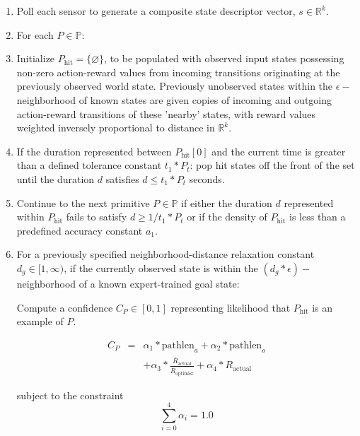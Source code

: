 \documentclass[letterpaper]{article}
\begin{document}
\begin{enumerate}
\item
Poll each sensor to generate a composite state descriptor vector, $s \in \mathbb{R}^k$.
\item
For each $P \in \mathbb{P}$:
\item
Initialize $P_{\mathrm{hit}} = \{\varnothing\}$, to be populated with observed input states possessing non-zero action-reward values from incoming transitions originating at the previously observed world state. Previously unobserved states within the $\epsilon-$neighborhood of known states are given copies of incoming and outgoing action-reward transitions of these 'nearby' states, with reward values weighted inversely proportional to distance in $\mathbb{R}^k$.
\item
If the duration represented between $P_{\mathrm{hit}}[0]$ and the current time is greater than a defined tolerance constant $t_1 * P_t$: pop hit states off the front of the set until the duration $d$ satisfies $d \leq t_1*P_t$ seconds.
\item
Continue to the next primitive $P \in \mathbb{P}$ if either the duration $d$ represented within $P_{\mathrm{hit}}$ fails to satisfy $d \geq 1/t_1 * P_t$ or if the density of $P_{\mathrm{hit}}$ is less than a predefined accuracy constant $a_1$.
\item
For a previously specified neighborhood-distance relaxation constant $d_g \in [1,\infty)$, if the currently observed state is within the $(d_g * \epsilon)-$neighborhood of a known expert-trained goal state:

Compute a confidence $C_P \in [0,1]$ representing likelihood that $P_{\mathrm{hit}}$ is an example of $P$.


$$ \begin{array} {lcl} C_P & = & \alpha_1*\mathrm{pathlen}_{a} + \alpha_2*\mathrm{pathlen}_{o} \\ 
&  & + \alpha_3* \frac{\bar{R}_{\mathrm{actual}}}{\bar{R}_{\mathrm{optimist}}} + \alpha_4*R_{\mathrm{actual}} \end{array} $$

subject to the constraint
$$\sum_{i=0}^{4}\alpha_i = 1.0 $$


\end{enumerate}
\end{document}
